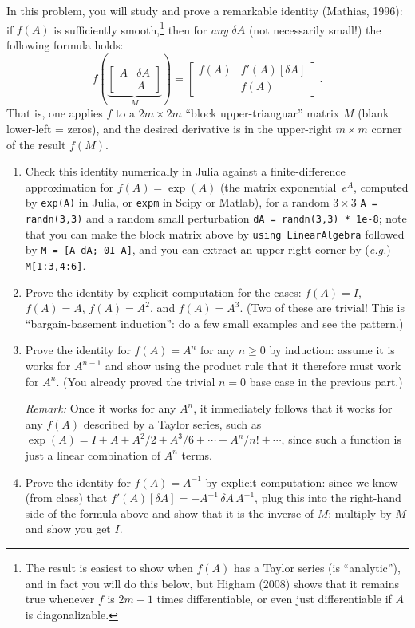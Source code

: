 \documentclass[10pt,oneside]{article}
\begin{document}
In this problem, you will study and prove a remarkable identity (Mathias, 1996): if $f(A)$ is sufficiently smooth,\footnote{The result is easiest to show when $f(A)$ has a Taylor series (is ``analytic''), and in fact you will do this below, but Higham (2008) shows that it remains true whenever $f$ is $2m-1$ times differentiable, or even just differentiable if $A$ is diagonalizable.} then for \emph{any} 
$\delta A$ (not necessarily small!) the following formula holds:
$$
f\left(\underbrace{\begin{bmatrix} A & \delta A \\ & A \end{bmatrix}}_M\right) = \begin{bmatrix} f(A) & f'(A)[\delta A] \\ & f(A) \end{bmatrix} \, .
$$
That is, one applies $f$ to a $2m \times 2m$ ``block upper-trianguar'' matrix $M$ (blank lower-left = zeros), and the desired derivative is in the upper-right $m \times m$ corner of the result $f(M)$.

\begin{enumerate}

\item Check this identity numerically in Julia against a finite-difference approximation for $f(A) = \exp(A)$ (the matrix exponential~$e^A$, computed by \texttt{exp(A)} in Julia, or \texttt{expm} in Scipy or Matlab), for a random $3 \times 3$ \texttt{A = randn(3,3)} and a random small perturbation \texttt{dA = randn(3,3) * 1e-8}; note that you can make the block matrix above by \texttt{using LinearAlgebra} followed by \texttt{M = [A dA; 0I A]}, and you can extract an upper-right corner by (\textit{e.g.}) \texttt{M[1:3,4:6]}.

\item Prove the identity by explicit computation for the cases: $f(A) = I$, $f(A) = A$, $f(A) = A^2$, and $f(A) = A^3$.  (Two of these are trivial!  This is ``bargain-basement induction'': do a few small examples and see the pattern.)

\item Prove the identity for $f(A) = A^n$ for any $n \ge 0$ by induction: assume it is works for $A^{n-1}$ and show using the product rule that it therefore must work for $A^n$.  (You already proved the trivial $n=0$ base case in the previous part.)

\emph{Remark:} 
Once it works for any $A^n$, it immediately follows that it works for any $f(A)$ described by a Taylor series, such as $\exp(A) = I + A + A^2/2 + A^3/6 + \cdots + A^n / n! + \cdots$, since such a function is just a linear combination of $A^n$ terms.

\item Prove the identity for $f(A) = A^{-1}$ by explicit computation: since we know (from class) that $f'(A)[\delta A] = -A^{-1} \, \delta A \, A^{-1}$, plug this into the right-hand side of the formula above and show that it is the inverse of $M$: multiply by $M$ and show you get $I$.

\end{enumerate}
\end{document}
